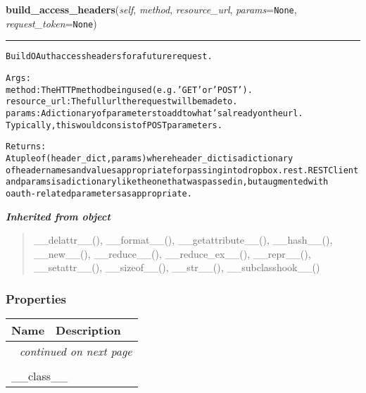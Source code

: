 \hspace{.8\funcindent}\begin{boxedminipage}{\funcwidth}

    \raggedright \textbf{build\_access\_headers}(\textit{self}, \textit{method}, \textit{resource\_url}, \textit{params}={\tt None}, \textit{request\_token}={\tt None})

    \vspace{-1.5ex}

    \rule{\textwidth}{0.5\fboxrule}
\setlength{\parskip}{2ex}
\begin{alltt}
Build OAuth access headers for a future request.

Args:
    method: The HTTP method being used (e.g. 'GET' or 'POST').
    resource\_url: The full url the request will be made to.
    params: A dictionary of parameters to add to what's already on the url.
        Typically, this would consist of POST parameters.

Returns:
    A tuple of (header\_dict, params) where header\_dict is a dictionary
    of header names and values appropriate for passing into dropbox.rest.RESTClient
    and params is a dictionary like the one that was passed in, but augmented with
    oauth-related parameters as appropriate.
\end{alltt}

\setlength{\parskip}{1ex}
    \end{boxedminipage}


\large{\textbf{\textit{Inherited from object}}}

\begin{quote}
\_\_delattr\_\_(), \_\_format\_\_(), \_\_getattribute\_\_(), \_\_hash\_\_(), \_\_new\_\_(), \_\_reduce\_\_(), \_\_reduce\_ex\_\_(), \_\_repr\_\_(), \_\_setattr\_\_(), \_\_sizeof\_\_(), \_\_str\_\_(), \_\_subclasshook\_\_()
\end{quote}


  \subsubsection{Properties}

    \vspace{-1cm}
\hspace{\varindent}\begin{longtable}{|p{\varnamewidth}|p{\vardescrwidth}|l}
\cline{1-2}
\cline{1-2} \centering \textbf{Name} & \centering \textbf{Description}& \\
\cline{1-2}
\endhead\cline{1-2}\multicolumn{3}{r}{\small\textit{continued on next page}}\\\endfoot\cline{1-2}
\endlastfoot\multicolumn{2}{|l|}{\textit{Inherited from object}}\\
\multicolumn{2}{|p{\varwidth}|}{\raggedright \_\_class\_\_}\\
\cline{1-2}
\end{longtable}


